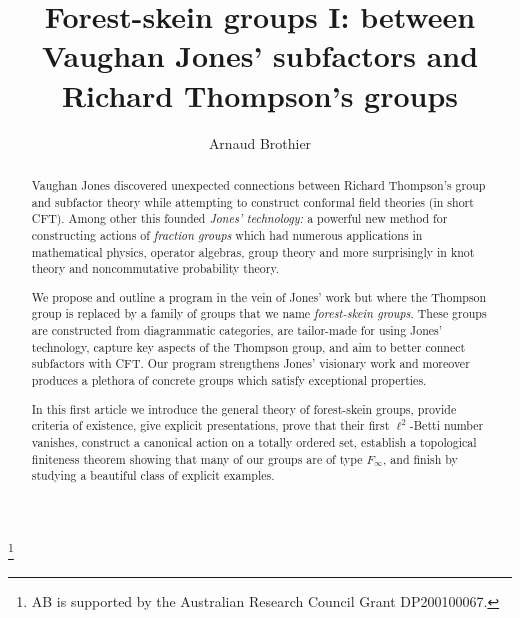 \documentclass[a4paper, 12pt]{amsart}
\numberwithin{equation}{section}
\theoremstyle{definition}
\providecommand{\keywords}[1]{\tbf{\textit{Index terms---}} #1}
\begin{document}
\title[Forest-skein groups I]{Forest-skein groups I: between Vaughan Jones' subfactors and Richard Thompson's groups}

\thanks{
AB is supported by the Australian Research Council Grant DP200100067.}
\author{Arnaud Brothier}
\address{Arnaud Brothier\\ School of Mathematics and Statistics, University of New South Wales, Sydney NSW 2052, Australia}

\begin{abstract}
Vaughan Jones discovered unexpected connections between Richard Thompson's group and subfactor theory while attempting to construct conformal field theories (in short CFT).
Among other this founded {\it Jones' technology:} a powerful new method for constructing actions of {\it fraction groups} which had numerous applications in mathematical physics, operator algebras, group theory and more surprisingly in knot theory and noncommutative probability theory. 

We propose and outline a program in the vein of Jones' work but where the Thompson group is replaced by a family of groups that we name {\it forest-skein groups}. 
These groups are constructed from diagrammatic categories, are tailor-made for using Jones' technology, capture key aspects of the Thompson group, and aim to better connect subfactors with CFT.
Our program strengthens Jones' visionary work and moreover produces a plethora of concrete groups which satisfy exceptional properties.

In this first article we introduce the general theory of forest-skein groups, provide criteria of existence, give explicit presentations, prove that their first $\ell^2$-Betti number vanishes, construct a canonical action on a totally ordered set, establish a topological finiteness theorem showing that many of our groups are of type $F_\infty$, and finish by studying a beautiful class of explicit examples. 
\end{abstract}


\maketitle

\end{document}
